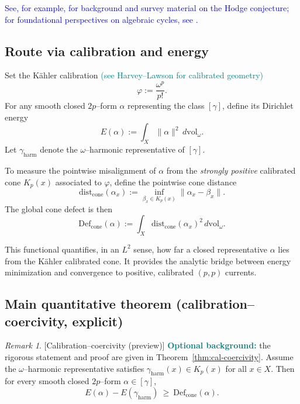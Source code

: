 \documentclass[11pt]{article}
\newcommand{\REV}[1]{\textcolor{blue}{#1}}
\newcommand{\REVMZ}[1]{\textcolor{teal}{#1}}  %
\numberwithin{equation}{section}  %
\theoremstyle{plain}
\theoremstyle{definition}
\theoremstyle{remark}
\newtheorem{remark}[theorem]{Remark}
\newcommand{\dist}{\mathrm{dist}}
\newcommand{\harm}{\mathrm{harm}}
\newcommand{\Def}{\mathrm{Def}}
\newcommand{\cone}{\mathrm{cone}}
\begin{document}
\REV{See, for example, \cite{Voisin02,Lewis99} for background and survey material on the Hodge conjecture; for foundational perspectives on algebraic cycles, see \cite{Kleiman68,Grothendieck69,Fulton98}.}

\subsection*{Route via calibration and energy}

Set the K\"ahler calibration \REVMZ{(see Harvey--Lawson \cite{HL82} for calibrated geometry)}
\[
\varphi := \frac{\omega^{p}}{p!}.
\]
For any smooth closed $2p$--form $\alpha$ representing the class $[\gamma]$, define
its Dirichlet energy
\[
E(\alpha) := \int_{X} \|\alpha\|^{2}\, d\mathrm{vol}_{\omega}.
\]
Let $\gamma_{\harm}$ denote the $\omega$--harmonic representative of $[\gamma]$.

To measure the pointwise misalignment of $\alpha$ from the \emph{strongly positive} calibrated cone
$K_{p}(x)$ associated to $\varphi$, define the pointwise cone distance
\[
\dist_{\cone}(\alpha_{x})
:=
\inf_{\beta_x\in K_p(x)}\|\alpha_x-\beta_x\|.
\]
The global cone defect is then
\[
\Def_{\cone}(\alpha)
:=
\int_{X} \dist_{\cone}(\alpha_{x})^{2}\, d\mathrm{vol}_{\omega}.
\]

This functional quantifies, in an $L^{2}$ sense, how far a closed
representative $\alpha$ lies from the K\"ahler calibrated cone.  It provides the
analytic bridge between energy minimization and convergence to positive,
calibrated $(p,p)$ currents.

\subsection*{Main quantitative theorem (calibration--coercivity, explicit)}

\begin{remark}
\label{rem:spine-theorem-interpretation}[Calibration--coercivity (preview)]\label{thm:cal-coercivity-intro}
\REVMZ{\textbf{Optional background:}} the rigorous statement and proof are given in Theorem~\ref{thm:cal-coercivity}.
Assume the $\omega$--harmonic representative satisfies $\gamma_{\harm}(x)\in K_p(x)$ for all $x\in X$.
Then for every smooth closed $2p$--form $\alpha \in [\gamma]$,
\[
E(\alpha) - E(\gamma_{\harm})\ \ge\ \Def_{\cone}(\alpha).
\]
\end{remark}
\end{document}
